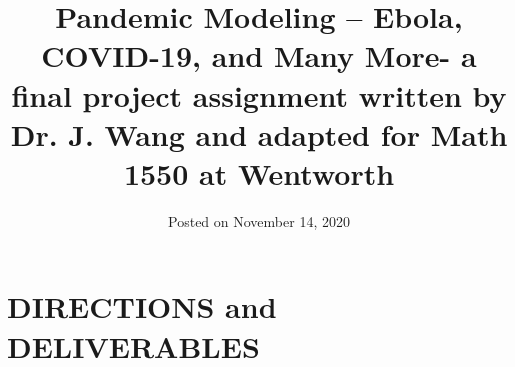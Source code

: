 \documentclass[10pt,letterpaper]{article}
\begin{document}
\newpage


\title{Pandemic Modeling  -- Ebola, COVID-19, and Many More- a final project assignment written by Dr. J. Wang and adapted for Math 1550 at Wentworth}
\date{Posted on November 14, 2020}







\maketitle

\section*{DIRECTIONS and DELIVERABLES}
\end{document}

